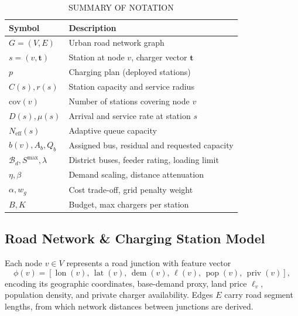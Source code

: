\documentclass[10pt, conference, a4paper, compsocconf]{IEEEtran}
\begin{document}
\begin{table}[!t]
\renewcommand{\arraystretch}{1.15}
\caption{\uppercase{Summary of notation}}
\label{tab:notation}
\centering
\footnotesize
\begin{tabular}{@{}p{1.4cm}p{5.3cm}@{}}
\toprule
Symbol & Description \\
\midrule
$G=(V,E)$ & Urban road network graph \\
$s=(v,\mathbf{t})$ & Station at node $v$, charger vector $\mathbf{t}$ \\
$p$ & Charging plan (deployed stations) \\
$C(s), r(s)$ & Station capacity and service radius \\
$\text{cov}(v)$ & Number of stations covering node $v$ \\
$D(s), \mu(s)$ & Arrival and service rate at station $s$ \\
$N_{\text{eff}}(s)$ & Adaptive queue capacity \\
$b(v), A_b, Q_b$ & Assigned bus, residual and requested capacity \\
$\mathcal{B}_d, S^{\max}, \lambda$ & District buses, feeder rating, loading limit \\
$\eta, \beta$ & Demand scaling, distance attenuation \\
$\alpha, w_g$ & Cost trade-off, grid penalty weight \\
$B, K$ & Budget, max chargers per station \\
\bottomrule
\end{tabular}
\end{table}

\subsection{Road Network \& Charging Station Model}

Each node $v \in V$ represents a road junction with feature vector
\[
\phi(v)=
\left[
\operatorname{lon}(v),\,
\operatorname{lat}(v),\,
\operatorname{dem}(v),\,
\ell(v),\,
\operatorname{pop}(v),\,
\operatorname{priv}(v)
\right],
\]
encoding its geographic coordinates, base-demand proxy, land price $\ell_v$,
population density, and private charger availability. Edges $E$ carry road segment lengths, from which network distances between junctions are derived.
\end{document}
